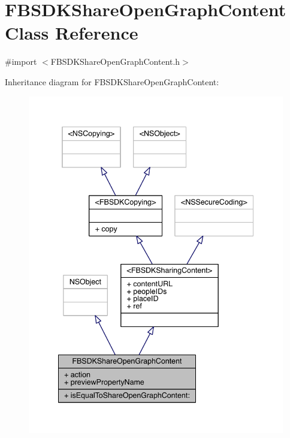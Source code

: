 \hypertarget{interface_f_b_s_d_k_share_open_graph_content}{\section{F\-B\-S\-D\-K\-Share\-Open\-Graph\-Content Class Reference}
\label{interface_f_b_s_d_k_share_open_graph_content}
}


{\ttfamily \#import $<$F\-B\-S\-D\-K\-Share\-Open\-Graph\-Content.\-h$>$}



Inheritance diagram for F\-B\-S\-D\-K\-Share\-Open\-Graph\-Content\-:
\nopagebreak
\begin{figure}[H]
\begin{center}
\leavevmode
\includegraphics[width=341pt]{interface_f_b_s_d_k_share_open_graph_content__inherit__graph}
\end{center}
\end{figure}


